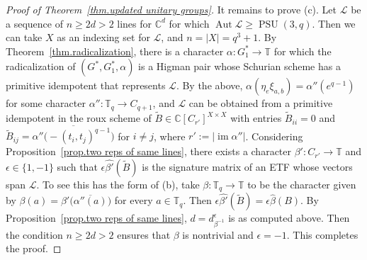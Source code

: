 \begin{proof}[Proof of Theorem~\ref{thm.updated unitary groups}]
It remains to prove (c).
Let $\mathscr{L}$ be a sequence of $n \geq 2d > 2$ lines for $\mathbb{C}^d$ for which $\operatorname{Aut} \mathscr{L} \geq \operatorname{PSU}(3,q)$.
Then we can take $X$ as an indexing set for $\mathscr{L}$, and $n = |X| = q^3+1$.
By Theorem~\ref{thm.radicalization}, there is a character $\alpha \colon G_1^* \to \mathbb{T}$ for which the radicalization of $(G^*,G_1^*,\alpha)$ is a Higman pair whose Schurian scheme has a primitive idempotent that represents $\mathscr{L}$.
By the above, $\alpha(\eta_e \xi_{a,b}) = \alpha''(e^{q-1})$ for some character $\alpha'' \colon \mathbb{T}_q \to C_{q+1}$, and $\mathscr{L}$ can be obtained from a primitive idempotent in the roux scheme of $\tilde{B} \in \mathbb{C}[C_{r'}]^{X \times X}$ with entries $\tilde{B}_{ii} = 0$ and $\tilde{B}_{ij} = \overline{ \alpha''\bigl( - (t_i,t_j)^{q-1} \bigr) }$ for $i \neq j$, where $r' := | \operatorname{im} \alpha''|$.
Considering Proposition~\ref{prop.two reps of same lines}, there exists a character $\beta' \colon C_{r'} \to \mathbb{T}$ and $\epsilon \in \{1,-1\}$ such that $\epsilon\hat{\beta'}(\tilde{B})$ is the signature matrix of an ETF whose vectors span $\mathscr{L}$.
To see this has the form of (b), take $\beta \colon \mathbb{T}_q \to \mathbb{T}$ to be the character given by $\beta(a) = \beta'\bigl( \overline{ \alpha''(a) } \bigr)$ for every $a \in \mathbb{T}_q$.
Then $\epsilon \hat{\beta'}(\tilde{B}) = \epsilon \hat{\beta}(B)$.
By Proposition~\ref{prop.two reps of same lines}, $d = d_{\beta^{-1}}^\epsilon$ is as computed above.
Then the condition $n \geq 2d > 2$ ensures that $\beta$ is nontrivial and $\epsilon = -1$.
This completes the proof.
\end{proof}

